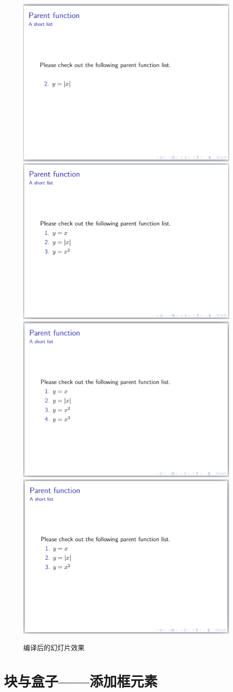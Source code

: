 \begin{figure}[htbp]
    \centering
    \includegraphics[width = 0.45\linewidth]{images/ch_9/NEWexample10_1.png}
    \includegraphics[width = 0.45\linewidth]{images/ch_9/NEWexample10_2.png}
    \includegraphics[width = 0.45\linewidth]{images/ch_9/NEWexample10_3.png}
    \includegraphics[width = 0.45\linewidth]{images/ch_9/NEWexample10_4.png}
    \caption{编译后的幻灯片效果}
    \label{fig:916}
\end{figure}

\section{块与盒子——添加框元素}

